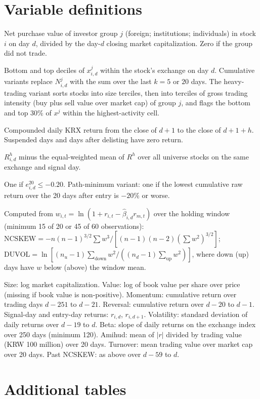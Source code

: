 \documentclass[11pt]{article}
\begin{document}
\section{Variable definitions}\label{app:vars}
\begin{small}
\begin{description}\itemsep1pt
\item[Net-buying intensity $x^j_{i,d}$.] Net purchase value of investor group $j$ (foreign; institutions; individuals)
in stock $i$ on day $d$, divided by the day-$d$ closing market capitalization. Zero if the group did not trade.
\item[Extreme signals $S^j$, $B^j$.] Bottom and top deciles of $x^j_{i,d}$ within the stock's exchange on day $d$.
Cumulative variants replace $N^j_{i,d}$ with the sum over the last $k=5$ or $20$ days. The heavy-trading variant sorts
stocks into size terciles, then into terciles of gross trading intensity (buy plus sell value over market cap) of group
$j$, and flags the bottom and top 30\% of $x^j$ within the highest-activity cell.
\item[Holding return $R^h_{i,d}$.] Compounded daily KRX return from the close of $d+1$ to the close of $d+1+h$.
Suspended days and days after delisting have zero return.
\item[Market-adjusted return $e^h_{i,d}$.] $R^h_{i,d}$ minus the equal-weighted mean of $R^h$ over all universe stocks on
the same exchange and signal day.
\item[Tail event $Y_{i,d}$.] One if $e^{20}_{i,d}\le-0.20$. Path-minimum variant: one if the lowest cumulative raw return
over the 20 days after entry is $-20\%$ or worse.
\item[NCSKEW, DUVOL.] Computed from $w_{i,t}=\ln(1+r_{i,t}-\hat\beta_{i,d}r_{m,t})$ over the holding window
(minimum 15 of 20 or 45 of 60 observations): $\mathrm{NCSKEW}=-n(n-1)^{3/2}\sum w^3/[(n-1)(n-2)(\sum w^2)^{3/2}]$;
$\mathrm{DUVOL}=\ln[(n_u-1)\sum_{\text{down}}w^2/((n_d-1)\sum_{\text{up}}w^2)]$, where down (up) days have $w$ below
(above) the window mean.
\item[Controls.] Size: log market capitalization. Value: log of book value per share over price (missing if book value
is non-positive). Momentum: cumulative return over trading days $d-251$ to $d-21$. Reversal: cumulative return over
$d-20$ to $d-1$. Signal-day and entry-day returns: $r_{i,d}$, $r_{i,d+1}$. Volatility: standard deviation of daily
returns over $d-19$ to $d$. Beta: slope of daily returns on the exchange index over 250 days (minimum 120). Amihud:
mean of $|r|$ divided by trading value (KRW 100 million) over 20 days. Turnover: mean trading value over market cap over
20 days. Past NCSKEW: as above over $d-59$ to $d$.
\end{description}
\end{small}

\section{Additional tables}\label{app:tables}


\end{document}
